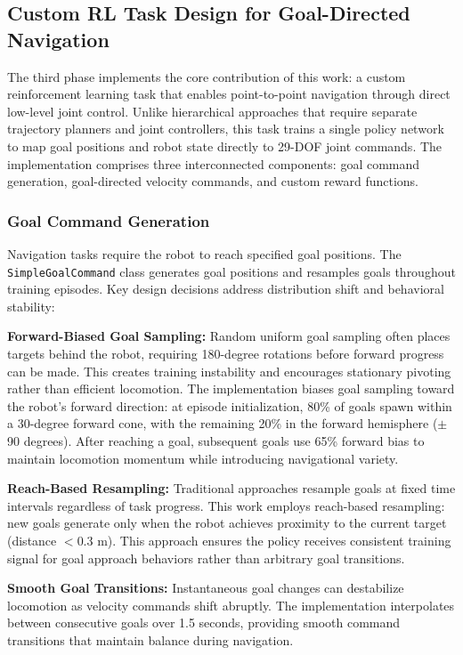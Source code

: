\documentclass[12pt,a4paper]{article}
\begin{document}
\subsection{Custom RL Task Design for Goal-Directed Navigation}

The third phase implements the core contribution of this work: a custom reinforcement learning task that enables point-to-point navigation through direct low-level joint control. Unlike hierarchical approaches that require separate trajectory planners and joint controllers, this task trains a single policy network to map goal positions and robot state directly to 29-DOF joint commands. The implementation comprises three interconnected components: goal command generation, goal-directed velocity commands, and custom reward functions.

\subsubsection{Goal Command Generation}

Navigation tasks require the robot to reach specified goal positions. The \texttt{SimpleGoalCommand} class generates goal positions and resamples goals throughout training episodes. Key design decisions address distribution shift and behavioral stability:

\textbf{Forward-Biased Goal Sampling:} Random uniform goal sampling often places targets behind the robot, requiring 180-degree rotations before forward progress can be made. This creates training instability and encourages stationary pivoting rather than efficient locomotion. The implementation biases goal sampling toward the robot's forward direction: at episode initialization, 80\% of goals spawn within a 30-degree forward cone, with the remaining 20\% in the forward hemisphere ($\pm$90 degrees). After reaching a goal, subsequent goals use 65\% forward bias to maintain locomotion momentum while introducing navigational variety.

\textbf{Reach-Based Resampling:} Traditional approaches resample goals at fixed time intervals regardless of task progress. This work employs reach-based resampling: new goals generate only when the robot achieves proximity to the current target (distance $< 0.3$ m). This approach ensures the policy receives consistent training signal for goal approach behaviors rather than arbitrary goal transitions.

\textbf{Smooth Goal Transitions:} Instantaneous goal changes can destabilize locomotion as velocity commands shift abruptly. The implementation interpolates between consecutive goals over 1.5 seconds, providing smooth command transitions that maintain balance during navigation.
\end{document}
